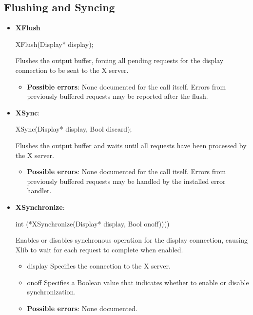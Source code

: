 \documentclass{report}
\begin{document}
    \pagebreak 
    \subsection{Flushing and Syncing}
    \begin{itemize}
        \item \textbf{XFlush}
            \bigbreak \noindent 
            \begin{cppcode}
                XFlush(Display* display);
            \end{cppcode}
            \bigbreak \noindent
            Flushes the output buffer, forcing all pending requests for the display connection to be sent to the X server.
            \begin{itemize}
                \item \textbf{Possible errors}: None documented for the call itself. Errors from previously buffered requests may be reported after the flush.
            \end{itemize}
        \item \textbf{XSync}:
            \bigbreak \noindent 
            \begin{cppcode}
                XSync(Display* display, Bool discard);
            \end{cppcode}
            \bigbreak \noindent
            Flushes the output buffer and waits until all requests have been processed by the X server.
            \begin{itemize}
                \item \textbf{Possible errors}: None documented for the call itself. Errors from previously buffered requests may be handled by the installed error handler.
            \end{itemize}
        \item \textbf{XSynchronize}:
            \bigbreak \noindent 
            \begin{cppcode}
                int (*XSynchronize(Display* display, Bool onoff))()
            \end{cppcode}
            \bigbreak \noindent
            Enables or disables synchronous operation for the display connection, causing Xlib to wait for each request to complete when enabled.
            \begin{itemize}
                \item display Specifies the connection to the X server.
                \item onoff Specifies a Boolean value that indicates whether to enable or disable synchronization.
            \end{itemize}
            \begin{itemize}
                \item \textbf{Possible errors}: None documented.
            \end{itemize}


    \end{itemize}
\end{document}
